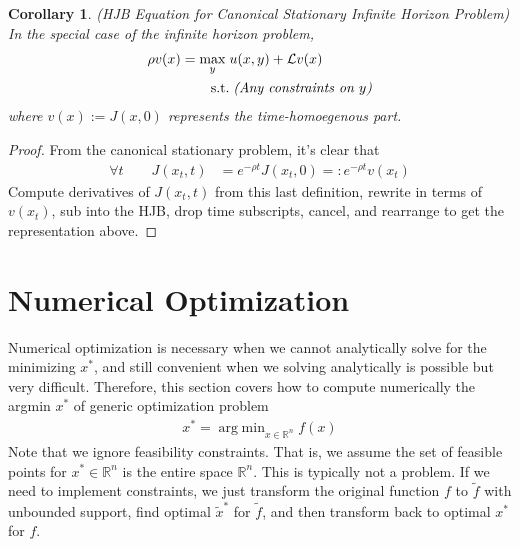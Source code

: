 \documentclass[12pt]{article}
\numberwithin{equation}{section} %
\theoremstyle{plain}
\newtheorem{cor}[thm]{Corollary}
\theoremstyle{definition}
\theoremstyle{remark}
\newcommand{\calL}{\mathcal{L}}
\newcommand{\Rn}{\mathbb{R}^n}
\DeclareMathOperator*{\argmin}{arg\;min}
\begin{document}
\begin{cor}
\emph{(HJB Equation for Canonical Stationary Infinite Horizon Problem)}
In the special case of the infinite horizon problem,
\begin{align*}
  \rho v(x)
  =
  \max_{y}
  \;&
  u(x,y)
  +
  \calL v(x)
  \\
  \qquad\text{s.t.}
  &
  \;
  \text{\emph{(Any constraints on $y$)}}
\end{align*}
where $v(x):=J(x,0)$ represents the time-homoegenous part.
\end{cor}
\begin{proof}
From the canonical stationary problem, it's clear that
\begin{align}
  \forall t
  \qquad
  J(x_t,t)
  &= e^{-\rho t}J(x_t,0)
  =: e^{-\rho t}v(x_t)
  \label{vdef}
\end{align}
Compute derivatives of $J(x_t,t)$ from this last definition, rewrite
in terms of $v(x_t)$, sub into the HJB, drop time
subscripts, cancel, and rearrange to get the representation above.
\end{proof}


\clearpage
\section{Numerical Optimization}

Numerical optimization is necessary when we cannot analytically solve
for the minimizing $x^*$, and still convenient when
we solving analytically is possible but very difficult.
Therefore, this section covers how to compute numerically the argmin
$x^*$ of generic optimization problem
\begin{align}
  \label{statement}
  x^* = \argmin_{x\in\Rn} f(x)
\end{align}
Note that we ignore feasibility constraints. That is, we assume the set
of feasible points for $x^*\in\Rn$ is the entire space $\Rn$.  This is
typically not a problem.  If we need to implement constraints, we just
transform the original function $f$ to $\tilde{f}$ with unbounded
support, find optimal $\tilde{x}^*$ for $\tilde{f}$, and then transform
back to optimal $x^*$ for $f$.
\end{document}
